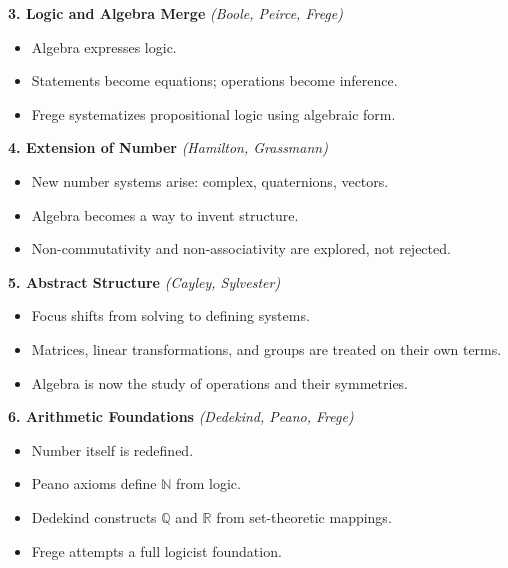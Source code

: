 \documentclass[9pt]{article}
\begin{document}
\bigskip

\textbf{3. Logic and Algebra Merge} \hfill \textit{(Boole, Peirce, Frege)}

\begin{itemize}
  \item Algebra expresses logic.
  \item Statements become equations; operations become inference.
  \item Frege systematizes propositional logic using algebraic form.
\end{itemize}

\bigskip

\textbf{4. Extension of Number} \hfill \textit{(Hamilton, Grassmann)}

\begin{itemize}
  \item New number systems arise: complex, quaternions, vectors.
  \item Algebra becomes a way to invent structure.
  \item Non-commutativity and non-associativity are explored, not rejected.
\end{itemize}

\bigskip

\textbf{5. Abstract Structure} \hfill \textit{(Cayley, Sylvester)}

\begin{itemize}
  \item Focus shifts from solving to defining systems.
  \item Matrices, linear transformations, and groups are treated on their own terms.
  \item Algebra is now the study of operations and their symmetries.
\end{itemize}

\bigskip

\textbf{6. Arithmetic Foundations} \hfill \textit{(Dedekind, Peano, Frege)}

\begin{itemize}
  \item Number itself is redefined.
  \item Peano axioms define $\mathbb{N}$ from logic.
  \item Dedekind constructs $\mathbb{Q}$ and $\mathbb{R}$ from set-theoretic mappings.
  \item Frege attempts a full logicist foundation.
\end{itemize}

\bigskip
\end{document}
